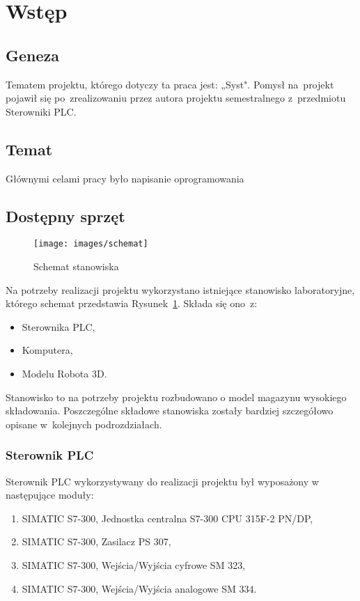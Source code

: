 \section{Wstęp}

\subsection{Geneza}
Tematem projektu, którego dotyczy ta praca jest: „Syst". Pomysł na~projekt pojawił się po~zrealizowaniu przez autora projektu semestralnego z~przedmiotu Sterowniki PLC.

\subsection{Temat}
Głównymi celami pracy było napisanie oprogramowania

\subsection{Dostępny sprzęt}
\begin{figure}[!htb] 	\centering 	\texttt{[image: images/schemat]} 	\caption{Schemat stanowiska} \label{schemat} \end{figure} 
Na potrzeby realizacji projektu wykorzystano istniejące stanowisko laboratoryjne, którego schemat przedstawia Rysunek~\ref{schemat}. Składa się ono~z:
\begin{itemize}
\item Sterownika PLC,
\item Komputera,
\item Modelu Robota 3D.
\end{itemize}
\indent
\indent Stanowisko to na potrzeby projektu rozbudowano o model magazynu wysokiego składowania. Poszczególne składowe stanowiska zostały bardziej szczegółowo opisane w~kolejnych podrozdziałach.
\subsubsection{Sterownik PLC}
Sterownik PLC wykorzystywany do realizacji projektu był wyposażony w następujące moduły:
\begin{enumerate}
\item SIMATIC S7-300, Jednostka centralna S7-300 CPU 315F-2 PN/DP,
\item SIMATIC S7-300, Zasilacz PS 307,
\item SIMATIC S7-300, Wejścia/Wyjścia cyfrowe SM 323,
\item SIMATIC S7-300, Wejścia/Wyjścia analogowe SM 334.
\end{enumerate}

